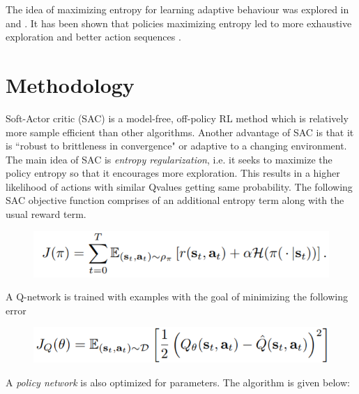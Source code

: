 \documentclass[conference]{IEEEtran}
\begin{document}
The idea of maximizing entropy for learning adaptive behaviour was explored in \cite{ziebart2010modelingB} and \cite{ziebart2008maximum}. It has been shown that policies maximizing entropy led to more exhaustive exploration and better action sequences \cite{DBLP:journals/corr/HaarnojaTAL17}. 

\section{Methodology}\label{secMethod}
Soft-Actor critic (SAC) \cite{DBLP:journals/corr/abs-1801-01290} is a model-free, off-policy RL method which is relatively more sample efficient than other algorithms. Another advantage of SAC is that it is ``robust to brittleness in convergence" or adaptive to a changing environment. The main idea of SAC is \textit{entropy regularization}, i.e. it seeks to maximize the policy entropy so that it encourages more exploration. This results in a higher likelihood of actions with similar Q\-values getting same probability. The following SAC objective function comprises of an additional entropy term along with the usual reward term. 
\begin{figure}[H]
\centering
\includegraphics[width=\linewidth]{img/figSACeq1.png}
\end{figure}
A Q-network is trained with examples with the goal of minimizing the following error
\begin{figure}[H]
\centering
\includegraphics[width=\linewidth]{img/figQNetErr.png}
\end{figure}
A \textit{policy network} is also optimized for parameters. The algorithm is given below:
\end{document}
